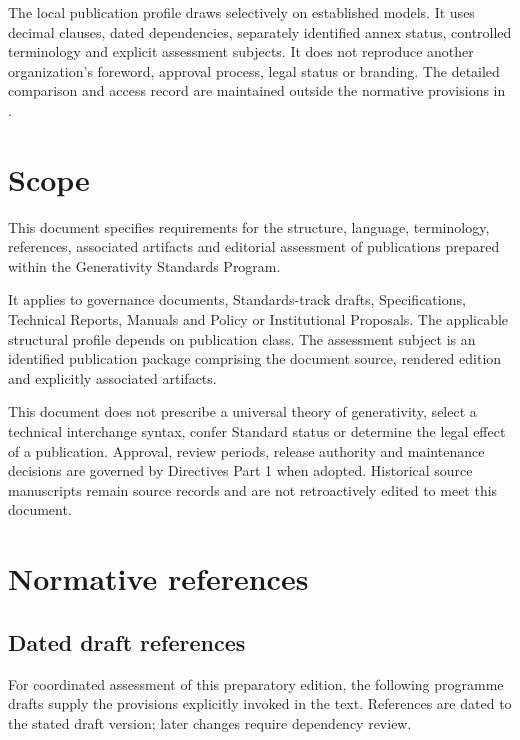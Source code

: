 \documentclass[11pt,a4paper]{article}
\begin{document}
The local publication profile draws selectively on established models. It uses decimal clauses, dated dependencies, separately identified annex status, controlled terminology and explicit assessment subjects. It does not reproduce another organization's foreword, approval process, legal status or branding. The detailed comparison and access record are maintained outside the normative provisions in .

\GSPmainmatter
\section{Scope}
This document specifies requirements for the structure, language, terminology, references, associated artifacts and editorial assessment of publications prepared within the Generativity Standards Program.

It applies to governance documents, Standards-track drafts, Specifications, Technical Reports, Manuals and Policy or Institutional Proposals. The applicable structural profile depends on publication class. The assessment subject is an identified publication package comprising the document source, rendered edition and explicitly associated artifacts.

This document does not prescribe a universal theory of generativity, select a technical interchange syntax, confer Standard status or determine the legal effect of a publication. Approval, review periods, release authority and maintenance decisions are governed by Directives Part 1 when adopted. Historical source manuscripts remain source records and are not retroactively edited to meet this document.

\section{Normative references}
\subsection{Dated draft references}
For coordinated assessment of this preparatory edition, the following programme drafts supply the provisions explicitly invoked in the text. References are dated to the stated draft version; later changes require dependency review.
\end{document}
